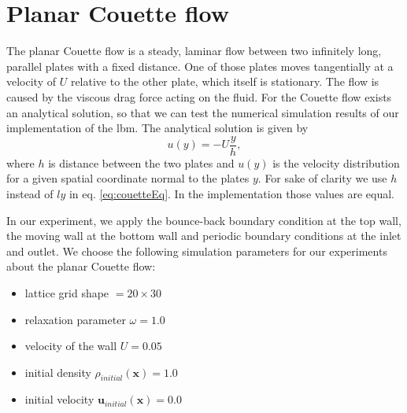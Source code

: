 \documentclass[a4paper,11pt, footsepline]{book}
\begin{document}
\section{Planar Couette flow}\label{sec-Couette}
The planar Couette flow is a steady, laminar flow between two infinitely long, parallel plates with a fixed distance. One of those plates moves tangentially at a velocity of $U$ relative to the other plate, which itself is stationary. The flow is caused by the viscous drag force acting on the fluid. For the Couette flow exists an analytical solution, so that we can test the numerical simulation results of our implementation of the \ac{lbm}. The analytical solution is given by
\begin{equation}
\label{eq:couetteEq}
u(y)=-U\frac{y}{h},
\end{equation}
where $h$ is distance between the two plates and $u(y)$ is the velocity distribution for a given spatial coordinate normal to the plates $y$. For sake of clarity we use $h$ instead of $ly$ in eq. \ref{eq:couetteEq}. In the implementation those values are equal.

In our experiment, we apply the bounce-back boundary condition at the top wall, the moving wall at the bottom wall and periodic boundary conditions at the inlet and outlet. We choose the following simulation parameters for our experiments about the planar Couette flow:
\begin{itemize}
\setlength\itemsep{0.15em}
\item lattice grid shape $=20\times 30$
\item relaxation parameter $\omega=1.0$
\item velocity of the wall $U=0.05$
\item initial density $\rho_{initial}(\mathbf{x})=1.0$
\item initial velocity $\mathbf{u}_{initial}(\mathbf{x})=0.0$
\end{itemize}
\end{document}
